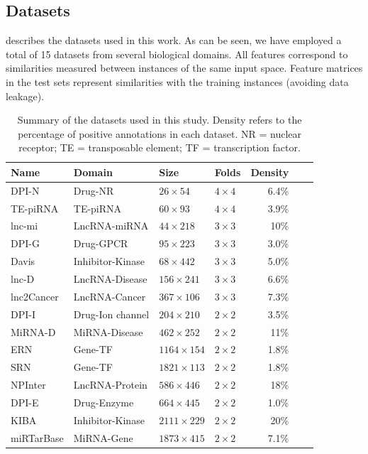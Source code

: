 \documentclass[letterpaper]{article}
\begin{document}
\subsection{Datasets}
\label{sec:datasets}

 describes the datasets used in this work.
As can be seen, we have employed a total of 15 datasets from several biological domains.
All features correspond to similarities measured between instances of the same input space.
Feature matrices in the test sets represent similarities with the training instances (avoiding data leakage).

\begin{table}[ht]
\centering
\small
\setlength{\tabcolsep}{1mm}
\begin{tabular}{llllrrl}
\toprule
Name & Domain & Size & Folds & Density \\
\midrule
DPI-N & Drug-NR & $26 \times 54$ & $4 \times 4$ & 6.4\% \\
TE-piRNA & TE-piRNA & $60 \times 93$ & $4 \times 4$ & 3.9\% \\
lnc-mi & LncRNA-miRNA & $44 \times 218$ & $3 \times 3$ & 10\% \\
DPI-G & Drug-GPCR & $95 \times 223$ & $3 \times 3$ & 3.0\% \\
Davis & Inhibitor-Kinase & $68 \times 442$ & $3 \times 3$ & 5.0\% \\
lnc-D & LncRNA-Disease & $156 \times 241$ & $3 \times 3$ & 6.6\% \\
lnc2Cancer & LncRNA-Cancer & $367 \times 106$ & $3 \times 3$ & 7.3\% \\
DPI-I & Drug-Ion channel & $204 \times 210$ & $2 \times 2$ & 3.5\% \\
MiRNA-D & MiRNA-Disease & $462 \times 252$ & $2 \times 2$ & 11\% \\
ERN & Gene-TF & $1164 \times 154$ & $2 \times 2$ & 1.8\% \\
SRN & Gene-TF & $1821 \times 113$ & $2 \times 2$ & 1.8\% \\
NPInter & LncRNA-Protein & $586 \times 446$ & $2 \times 2$ & 18\% \\
DPI-E & Drug-Enzyme & $664 \times 445$ & $2 \times 2$ & 1.0\% \\
KIBA & Inhibitor-Kinase & $2111 \times 229$ & $2 \times 2$ & 20\% \\
miRTarBase & MiRNA-Gene & $1873 \times 415$ & $2 \times 2$ & 7.1\% \\
\bottomrule
\end{tabular}
\caption{Summary of the datasets used in this study. Density refers to the percentage of positive annotations in each dataset. NR = nuclear receptor; TE = transposable element; TF = transcription factor.}
\label{tab:datasets}
\end{table}
\end{document}
